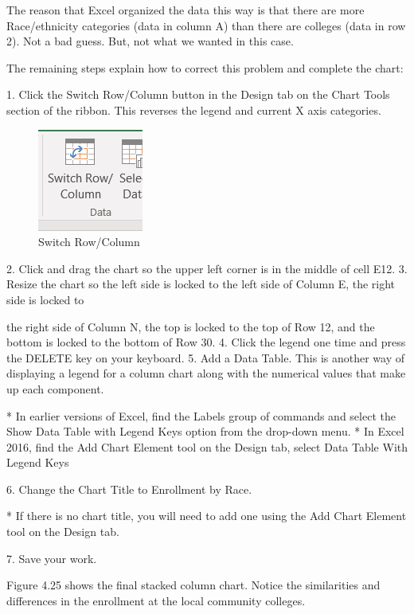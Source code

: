 The reason that Excel organized the data this way is that there are more Race/ethnicity categories
(data in column A) than there are colleges (data in row 2). Not a bad guess. But, not what we wanted
in this case.

The remaining steps explain how to correct this problem and complete the chart:

1. Click the Switch Row/Column button in the Design tab on the Chart Tools section of the
ribbon. This reverses the legend and current X axis categories.


\begin{figure}[H]
	\centering
	\includegraphics[width=\maxwidth{.95\linewidth}]{gfx/ch04_fig25}
	\caption{Switch Row/Column}
	\label{04:fig25}
\end{figure}





2. Click and drag the chart so the upper left corner is in the middle of cell E12.
3. Resize the chart so the left side is locked to the left side of Column E, the right side is locked to



the right side of Column N, the top is locked to the top of Row 12, and the bottom is locked to
the bottom of Row 30.
4. Click the legend one time and press the DELETE key on your keyboard.
5. Add a Data Table. This is another way of displaying a legend for a column chart along with the
numerical values that make up each component.

* In earlier versions of Excel, find the Labels group of commands and select the Show Data
Table with Legend Keys option from the drop-down menu.
* In Excel 2016, find the Add Chart Element tool on the Design tab, select Data Table With
Legend Keys

6. Change the Chart Title to Enrollment by Race.

* If there is no chart title, you will need to add one using the Add Chart Element tool on
the Design tab.

7. Save your work.

Figure 4.25 shows the final stacked column chart. Notice the similarities and differences in the
enrollment at the local community colleges.


